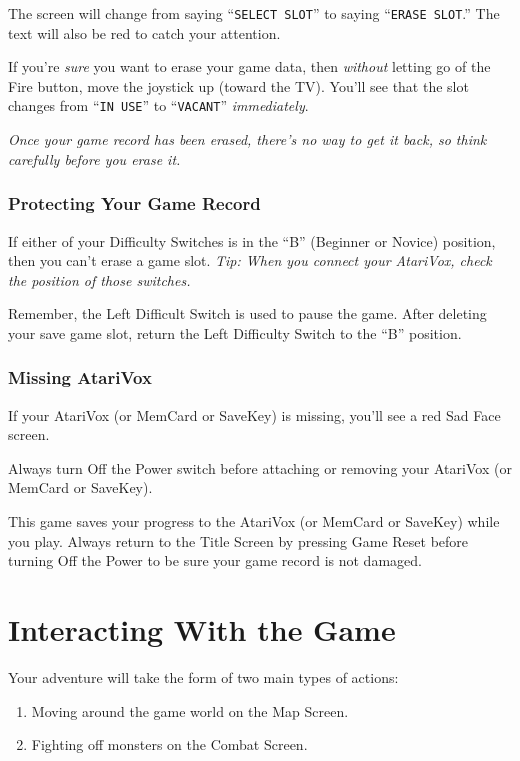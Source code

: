 \documentclass[12pt,twoside,openright,book]{memoir}
\begin{document}
The screen  will change from  saying ``\texttt{SELECT SLOT}''  to saying
``\texttt{ERASE  SLOT}.''   The  text   will  also   be  red   to  catch
your attention.

If  you're  \emph{sure}   you  want  to  erase  your   game  data,  then
\emph{without}  letting go  of the  Fire  button, move  the joystick  up
(toward  the TV).  You'll see  that the  slot changes  from ``\texttt{IN
  USE}'' to ``\texttt{VACANT}'' \emph{immediately}.

\emph{Once your  game record has been  erased, there's no way  to get it
  back, so think carefully before you erase it.}

\subsection{Protecting Your Game Record}

If  either of  your Difficulty  Switches is  in the  ``B'' (Beginner  or
Novice) position, then you can't erase  a game slot. \emph{Tip: When you
  connect your AtariVox, check the position of those switches.}

\ifdef\TVSECAM
Remember,  the  Left  Difficult  Switch  is  used  to  pause  the  game.
After deleting your save game slot, return the Left Difficulty Switch to
the ``B'' position.
\fi

\subsection{Missing AtariVox}

If your  AtariVox (or MemCard or  SaveKey) is missing, you'll  see a red
Sad Face screen.

Always  turn Off  the Power  switch  before attaching  or removing  your
AtariVox (or MemCard or SaveKey).

This game  saves your progress to  the AtariVox (or MemCard  or SaveKey)
while you play. Always return to the Title Screen by pressing Game Reset
before turning Off the Power to be sure your game record is not damaged.

\chapter{Interacting With the Game}

Your adventure will take the form of two main types of actions:

\begin{enumerate}
\item Moving around the game world on the Map Screen.
\item Fighting off monsters on the Combat Screen.
\end{enumerate}
\end{document}
